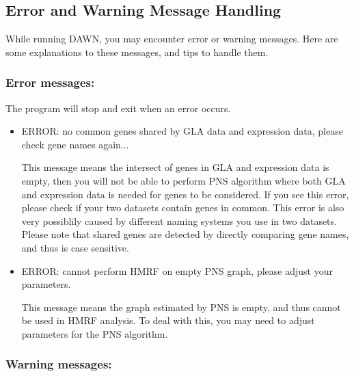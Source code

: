 \documentclass{article}
\begin{document}
\subsection{Error and Warning Message Handling}
	While running DAWN, you may encounter error or warning messages. Here are some explanations to these messages, and tips to handle them.
	
	\subsubsection{Error messages:}
	
	The program will stop and exit when an error occurs.
	\begin{itemize}
		\item ERROR: no common genes shared by GLA data and expression data, please check gene names again...
		
		This message means the intersect of genes in GLA and expression data is empty, then you will not be able to perform PNS algorithm where both GLA and expression data is needed for genes to be considered. If you see this error, please check if your two datasets contain genes in common. This error is also very possiblily caused by different naming systems you use in two datasets. Please note that shared genes are detected by directly comparing gene names, and thus is case sensitive.
		
		\item ERROR: cannot perform HMRF on empty PNS graph, please adjust your parameters.
		
		This message means the graph estimated by PNS is empty, and thus cannot be used in HMRF analysis. To deal with this, you may need to adjust parameters for the PNS algorithm.
	\end{itemize}
	
	\subsubsection{Warning messages:}
	
\end{document}
